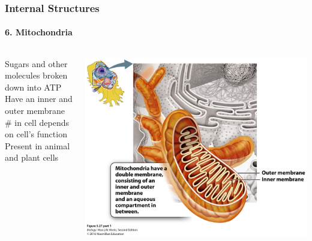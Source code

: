 \documentclass[10pt]{beamer}
\begin{document}
\begin{frame}[t]
\frametitle{Internal Structures}
\framesubtitle{6. Mitochondria}	
\vspace{0.5cm}

		\begin{columns}
		\begin{column}{0.5\textwidth}
			Sugars and other molecules broken down into ATP\\
			\vspace{0.25cm}
			Have an inner and outer membrane\\
			\vspace{0.25cm}
			\# in cell depends on cell's function\\
			\vspace{0.25cm}
			Present in animal and plant cells\\
		\end{column}
		
		\begin{column}{0.5\textwidth}
			\centerline{\includegraphics[width=1.0\textwidth]{figures/figure_05_27_01.jpg}}
		\end{column}
	\end{columns}
\end{frame}
	
\end{document}
